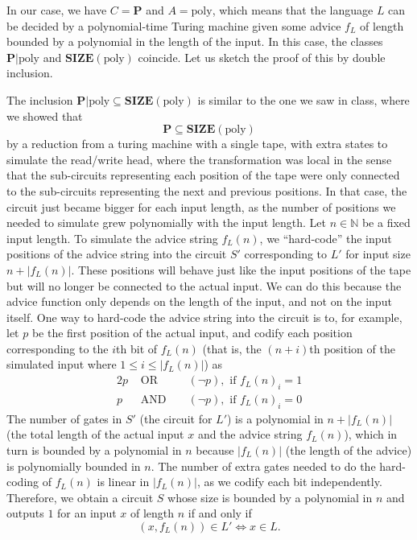 \documentclass{amsart}
\theoremstyle{plain}
\theoremstyle{definition}
\newcommand{\N}{\mathbb{N}}
\newcommand{\size}[1]{\textbf{SIZE}(#1)}
\newcommand{\poly}{\text{poly}}
\newcommand{\advice}[2]{#1 | #2}
\newcommand{\p}{\textbf{P}}
\begin{document}
\begin{enumerate}[label=\textbf{Exercise \arabic*:}, leftmargin=0cm, labelwidth=-0.2cm, align=left]
        In our case, we have $C = \p$ and $A = \poly$, which means that the language $L$
        can be decided by a polynomial-time Turing machine given some advice $f_L$
        of length bounded by a polynomial in the length of the input.
        In this case, the classes $\advice{\p}{\poly}$ and $\size{\poly}$ coincide.
        Let us sketch the proof of this by double inclusion.

        The inclusion $\advice{\p}{\poly} \subseteq \size{\poly}$ is similar to the one we saw in class,
        where we showed that
        \[
            \p \subseteq \size{\poly}
        \]
        by a reduction from a turing machine with a single tape, with extra states to simulate the read/write head,
        where the transformation was local in the sense that the sub-circuits representing each position of the tape
        were only connected to the sub-circuits representing the next and previous positions.
        In that case, the circuit just became bigger for each input length, as the number of positions we needed to simulate
        grew polynomially with the input length.
        Let $n \in \N$ be a fixed input length.
        To simulate the advice string $f_L(n)$, we ``hard-code''
        the input positions of the advice string into the circuit $S'$ corresponding to $L'$ for input size $n + |f_L(n)|$.
        These positions will behave just like the input positions of the tape but will no longer be connected to the actual input.
        We can do this because the advice function only depends on the length of the input, and not on the input itself.
        One way to hard-code the advice string into the circuit is to, for example, let $p$ be the first position of the actual input,
        and codify each position corresponding to the $i$th bit of $f_L(n)$ (that is, the ${(n+i)}$th
        position of the simulated input where $1 \leq i \leq |f_L(n)|$) as
        \begin{alignat*}{2}
            p &\text{ OR }  &&(\neg p), \text{ if } f_L(n)_i = 1 \\
            p &\text{ AND } &&(\neg p), \text{ if } f_L(n)_i = 0
        \end{alignat*}
        The number of gates in $S'$ (the circuit for $L'$) is a polynomial in $n + |f_L(n)|$
        (the total length of the actual input $x$ and the advice string $f_L(n)$),
        which in turn is bounded by a polynomial in $n$ because $|f_L(n)|$ (the length of the advice)
        is polynomially bounded in $n$.
        The number of extra gates needed to do the hard-coding of $f_L(n)$ is linear in $|f_L(n)|$, as we codify each bit independently.
        Therefore, we obtain a circuit $S$ whose size is bounded by a polynomial in $n$ and
        outputs $1$ for an input $x$ of length $n$ if and only if
        \[
            (x, f_L(n)) \in L' \iff x \in L.
        \]


\end{enumerate}
\end{document}
